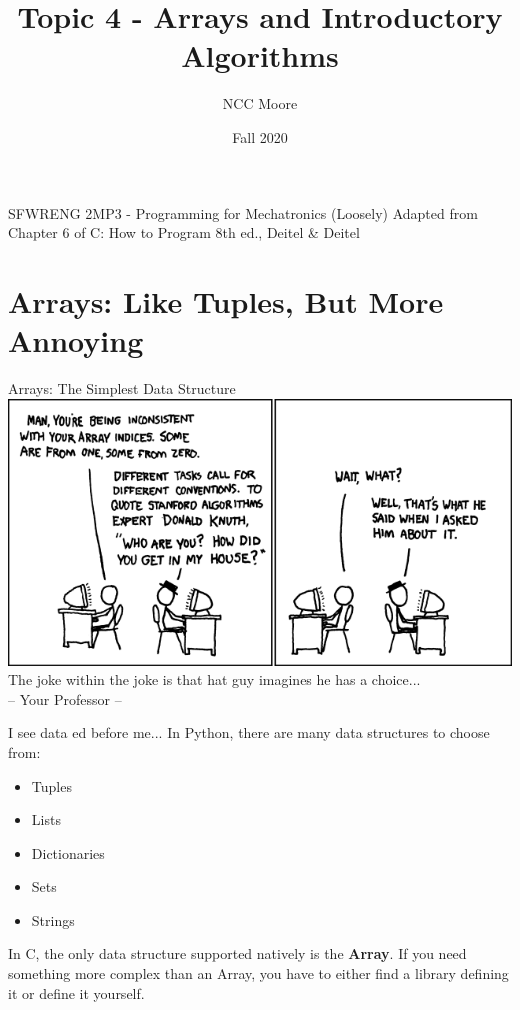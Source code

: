 \documentclass[11pt]{beamer}
\author{NCC Moore}
\title{Topic 4 - Arrays and Introductory Algorithms}
\institute{McMaster University}
\date{Fall 2020}
\let\OldTexttt\texttt
\renewcommand{\texttt}[1]{\OldTexttt{\color{teal}{#1}}}
\begin{document}
\begin{frame}
\center
SFWRENG 2MP3 - Programming for Mechatronics
\titlepage
(Loosely) Adapted from Chapter 6 of C: How to Program 8th ed., Deitel \& Deitel
\end{frame}

\begin{frame}
\tableofcontents
\end{frame}

\section[Arrays]{Arrays: Like Tuples, But More Annoying} %
\begin{frame}{Arrays: The Simplest Data Structure}
\center
\includegraphics[scale=3]{donald_knuth.png} \\
The joke within the joke is that hat guy imagines he has a choice... \\ 
-- Your Professor -- 
\end{frame}

\begin{frame}{I see data \texttt{Array}ed before me...}
In Python, there are many data structures to choose from:
\begin{itemize}
\item Tuples
\item Lists
\item Dictionaries
\item Sets
\item Strings
\end{itemize}
In C, the only data structure supported natively is the \textbf{Array}.  If you need something more complex than an Array, you have to either find a library defining it or define it yourself. 
\end{frame}
\end{document}
